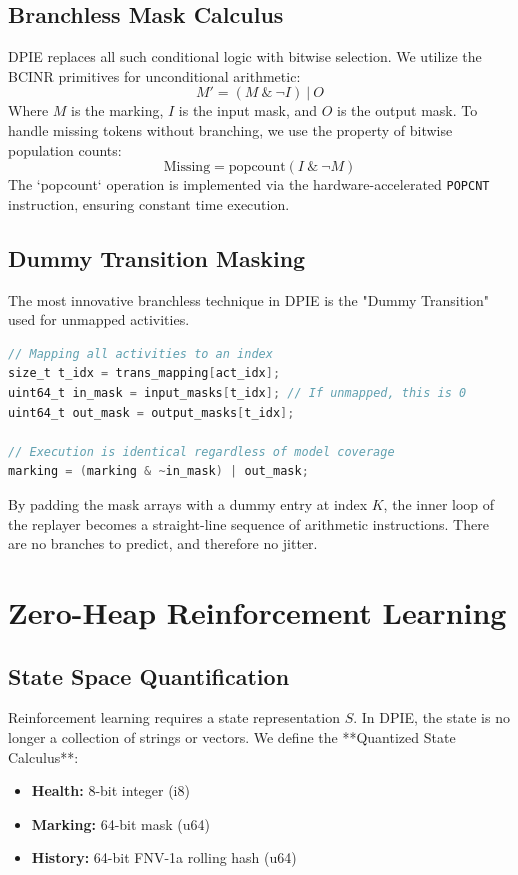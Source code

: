\documentclass[12pt,a4paper]{report}
\begin{document}
\section{Branchless Mask Calculus}
DPIE replaces all such conditional logic with bitwise selection. We utilize the BCINR primitives for unconditional arithmetic:
\begin{equation}
M' = (M \ \& \ \neg I) \ | \ O
\end{equation}
Where $M$ is the marking, $I$ is the input mask, and $O$ is the output mask. To handle missing tokens without branching, we use the property of bitwise population counts:
\begin{equation}
\text{Missing} = \text{popcount}(I \ \& \ \neg M)
\end{equation}
The `popcount` operation is implemented via the hardware-accelerated \texttt{POPCNT} instruction, ensuring constant time execution.

\section{Dummy Transition Masking}
The most innovative branchless technique in DPIE is the "Dummy Transition" used for unmapped activities.
\begin{lstlisting}[language=C, caption=Branchless Hot Path in DPIE]
// Mapping all activities to an index
size_t t_idx = trans_mapping[act_idx];
uint64_t in_mask = input_masks[t_idx]; // If unmapped, this is 0
uint64_t out_mask = output_masks[t_idx];

// Execution is identical regardless of model coverage
marking = (marking & ~in_mask) | out_mask;
\end{lstlisting}
By padding the mask arrays with a dummy entry at index $K$, the inner loop of the replayer becomes a straight-line sequence of arithmetic instructions. There are no branches to predict, and therefore no jitter.

\chapter{Zero-Heap Reinforcement Learning}
\section{State Space Quantification}
Reinforcement learning requires a state representation $S$. In DPIE, the state is no longer a collection of strings or vectors. We define the **Quantized State Calculus**:
\begin{itemize}
    \item \textbf{Health:} 8-bit integer (i8)
    \item \textbf{Marking:} 64-bit mask (u64)
    \item \textbf{History:} 64-bit FNV-1a rolling hash (u64)
\end{itemize}
\end{document}

